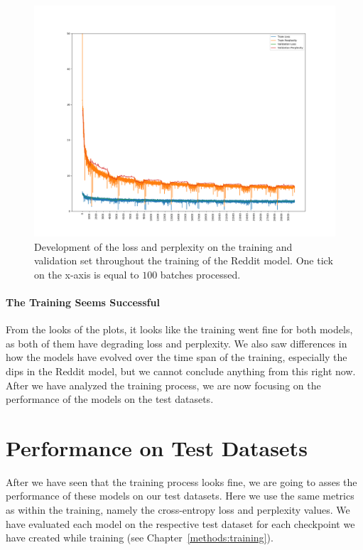 \begin{figure}[H]
	\includegraphics[width=\linewidth]{img/plots/reddit/train_metrics.png}
	\caption{Development of the loss and perplexity on the training and validation set throughout the training of the Reddit model. One tick on the x-axis is equal to $100$ batches processed.}
	\label{results:learning_process:metrics:reddit}
\end{figure} 

\paragraph{The Training Seems Successful} From the looks of the plots, it looks like the training went fine for both models, as both of them have degrading loss and perplexity. We also saw differences in how the models have evolved over the time span of the training, especially the dips in the Reddit model, but we cannot conclude anything from this right now. After we have analyzed the training process, we are now focusing on the performance of the models on the test datasets.

\section{Performance on Test Datasets}
After we have seen that the training process looks fine, we are going to asses the performance of these models on our test datasets. Here we use the same metrics as within the training, namely the cross-entropy loss and perplexity values. We have evaluated each model on the respective test dataset for each checkpoint we have created while training (see Chapter~\ref{methods:training}).

